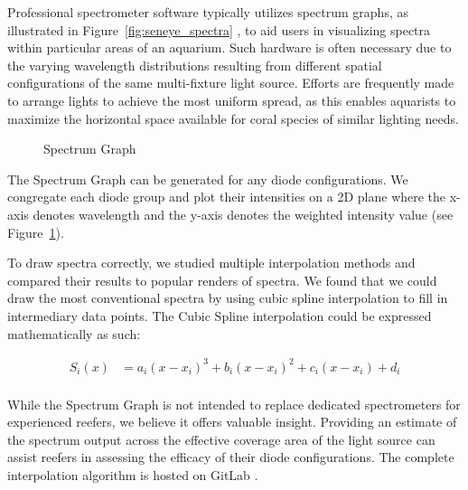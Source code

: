 \documentclass[8pt,twocolumn]{article}
\begin{document}
Professional spectrometer software typically utilizes spectrum graphs, as illustrated in Figure~\ref{fig:seneye_spectra} \cite{seneye}, to aid users in visualizing spectra within particular areas of an aquarium. Such hardware is often necessary due to the varying wavelength distributions resulting from different spatial configurations of the same multi-fixture light source. Efforts are frequently made to arrange lights to achieve the most uniform spread, as this enables aquarists to maximize the horizontal space available for coral species of similar lighting needs.

\begin{figure}[!htp]
    \centering
    \caption{Spectrum Graph\label{fig:spectrum}}
\end{figure}

The Spectrum Graph can be generated for any diode configurations. We congregate each diode group and plot their intensities on a 2D plane where the x-axis denotes wavelength and the y-axis denotes the weighted intensity value (see Figure~\ref{fig:spectrum}).

To draw spectra correctly, we studied multiple interpolation methods and compared their results to popular renders of spectra. We found that we could draw the most conventional spectra by using cubic spline interpolation to fill in intermediary data points. The Cubic Spline interpolation could be expressed mathematically as such:

\begin{align*}
S_i(x) &= a_i(x-x_i)^3 + b_i(x-x_i)^2 + c_i(x-x_i) + d_i \\
\end{align*}


While the Spectrum Graph is not intended to replace dedicated spectrometers for experienced reefers, we believe it offers valuable insight. Providing an estimate of the spectrum output across the effective coverage area of the light source can assist reefers in assessing the efficacy of their diode configurations. The complete interpolation algorithm is hosted on GitLab .
\end{document}
